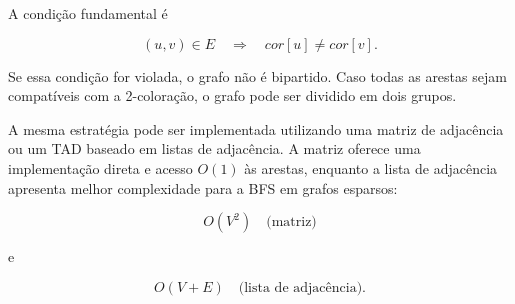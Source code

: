 \documentclass[12pt,a4paper]{article}
\begin{document}
A condição fundamental é

$$
(u,v)\in E
\quad\Longrightarrow\quad
cor[u]\neq cor[v].
$$

Se essa condição for violada, o grafo não é bipartido. Caso todas as
arestas sejam compatíveis com a 2-coloração, o grafo pode ser dividido
em dois grupos.

A mesma estratégia pode ser implementada utilizando uma matriz de
adjacência ou um TAD baseado em listas de adjacência. A matriz oferece
uma implementação direta e acesso $O(1)$ às arestas, enquanto a lista
de adjacência apresenta melhor complexidade para a BFS em grafos
esparsos:

$$
\boxed{
O(V^2)\quad\text{(matriz)}
}
$$

e

$$
\boxed{
O(V+E)\quad\text{(lista de adjacência)}.
}
$$
\end{document}
